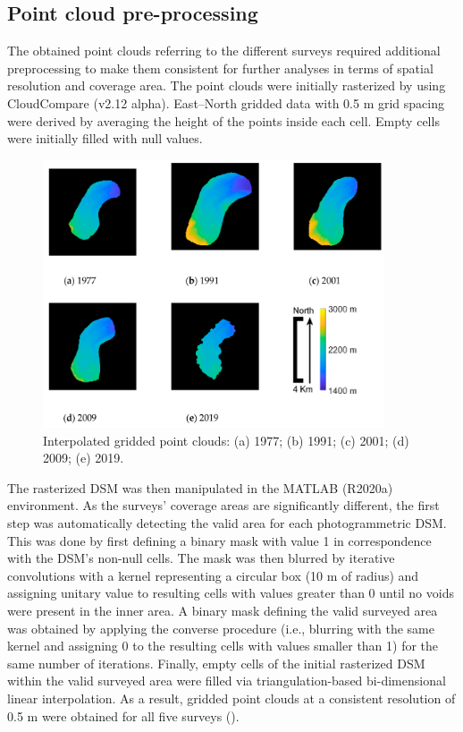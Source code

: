 \subsection{Point cloud pre-processing}\label{sec:2:pcd_preproc}

The obtained point clouds referring to the different surveys required additional preprocessing to make them consistent for further analyses in terms of spatial resolution and coverage area.
The point clouds were initially rasterized by using CloudCompare (v2.12 alpha).
East–North gridded data with 0.5 m grid spacing were derived by averaging the height of the points inside each cell. 
Empty cells were initially filled with null values.

\begin{figure}[ht]
    \centering
    \includegraphics[width=0.90\textwidth]{pcd_rasterized.png}
    \caption{Interpolated gridded point clouds: (a) 1977; (b) 1991; (c) 2001; (d) 2009; (e) 2019.}
    \label{fig:2:pcd_rasterzed}
\end{figure}

The rasterized DSM was then manipulated in the MATLAB (R2020a) environment.
As the surveys' coverage areas are significantly different, the first step was automatically detecting the valid area for each photogrammetric DSM. 
This was done by first defining a binary mask with value 1 in correspondence with the DSM's non-null cells. 
The mask was then blurred by iterative convolutions with a kernel representing a circular box (10 m of radius) and assigning unitary value to resulting cells with values greater than 0 until no voids were present in the inner area.
A binary mask defining the valid surveyed area was obtained by applying the converse procedure (i.e., blurring with the same kernel and assigning 0 to the resulting cells with values smaller than 1) for the same number of iterations.
Finally, empty cells of the initial rasterized DSM within the valid surveyed area were filled via triangulation-based bi-dimensional linear interpolation.
As a result, gridded point clouds at a consistent resolution of 0.5 m were obtained for all five surveys ().

